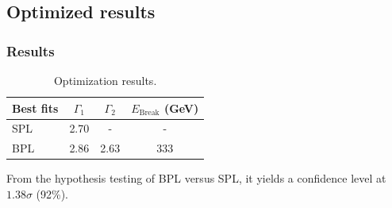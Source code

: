 \documentclass{beamer}
\begin{document}
\subsection{Optimized results}
\begin{frame}
\frametitle{Results}
\begin{table}
\begin{tabular}{l | c | c | c}
  Best fits & $\Gamma_1$ & $\Gamma_2$ & $E_{\text{Break}}$ (GeV) \\
  \hline \hline
  SPL & 2.70 & - & -  \\
  BPL & 2.86 & 2.63 & 333
\end{tabular}
\caption{Optimization results.}
\end{table}

From the hypothesis testing of BPL versus SPL, it yields
a confidence level at $1.38\sigma$ (92\%).

\end{frame}
\end{document}
